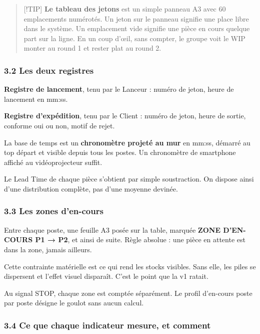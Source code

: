 \documentclass[
]{article}
\begin{document}
\begin{quote}
{[}!TIP{]} \textbf{Le tableau des jetons} est un simple panneau A3 avec
60 emplacements numérotés. Un jeton sur le panneau signifie une place
libre dans le système. Un emplacement vide signifie une pièce en cours
quelque part sur la ligne. En un coup d'œil, sans compter, le groupe
voit le WIP monter au round 1 et rester plat au round 2.
\end{quote}

\subsubsection{3.2 Les deux registres}\label{les-deux-registres}

\textbf{Registre de lancement}, tenu par le Lanceur : numéro de jeton,
heure de lancement en mm:ss.

\textbf{Registre d'expédition}, tenu par le Client : numéro de jeton,
heure de sortie, conforme oui ou non, motif de rejet.

La base de temps est un \textbf{chronomètre projeté au mur} en mm:ss,
démarré au top départ et visible depuis tous les postes. Un chronomètre
de smartphone affiché au vidéoprojecteur suffit.

Le Lead Time de chaque pièce s'obtient par simple soustraction. On
dispose ainsi d'une distribution complète, pas d'une moyenne devinée.

\subsubsection{3.3 Les zones d'en-cours}\label{les-zones-den-cours}

Entre chaque poste, une feuille A3 posée sur la table, marquée
\textbf{ZONE D'EN-COURS P1 → P2}, et ainsi de suite. Règle absolue : une
pièce en attente est dans la zone, jamais ailleurs.

Cette contrainte matérielle est ce qui rend les stocks visibles. Sans
elle, les piles se dispersent et l'effet visuel disparaît. C'est le
point que la v1 ratait.

Au signal STOP, chaque zone est comptée séparément. Le profil d'en-cours
poste par poste désigne le goulot sans aucun calcul.

\subsubsection{3.4 Ce que chaque indicateur mesure, et
comment}\label{ce-que-chaque-indicateur-mesure-et-comment}
\end{document}
